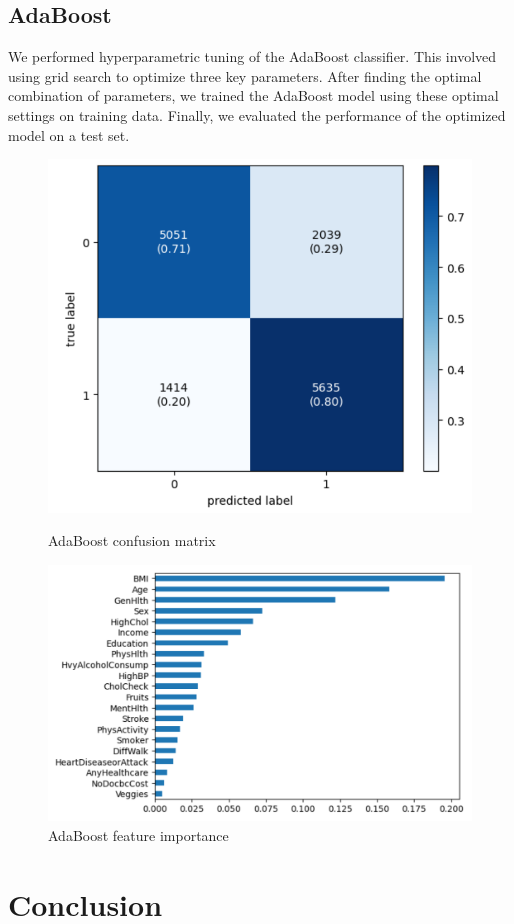 \documentclass[12pt]{article}
\begin{document}
\subsection{AdaBoost}
We performed hyperparametric tuning of the AdaBoost classifier. This involved using grid search to optimize three key parameters. After finding the optimal combination of parameters, we trained the AdaBoost model using these optimal settings on training data. Finally, we evaluated the performance of the optimized model on a test set.
\begin{figure}[H]
  \centering
  \begin{minipage}[b]{0.45\textwidth}
    \centering
    \includegraphics[width=0.7\linewidth]{adaboost_cm.png}
    \caption{AdaBoost confusion matrix}
  \end{minipage}\hfill
  \begin{minipage}[b]{0.45\textwidth}
    \centering
    \includegraphics[width=0.7\linewidth]{adaboost_w.png}
    \caption{AdaBoost feature importance}
  \end{minipage}
\end{figure}

\section{Conclusion}
\end{document}

